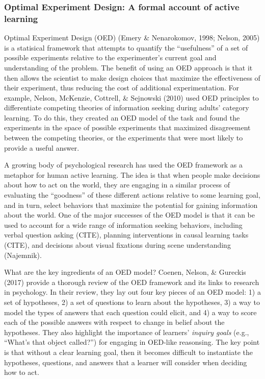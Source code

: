\documentclass[a4paper,man,apacite,floatsintext]{apa6}
\begin{document}
\subsubsection{Optimal Experiment Design: A formal account of active
learning}\label{optimal-experiment-design-a-formal-account-of-active-learning}

Optimal Experiment Design (OED) (Emery \& Nenarokomov, 1998; Nelson,
2005) is a statisical framework that attempts to quantify the
``usefulness'' of a set of possible experiments relative to the
experimenter's current goal and understanding of the problem. The
benefit of using an OED approach is that it then allows the scientist to
make design choices that maximize the effectiveness of their experiment,
thus reducing the cost of additional experimentation. For example,
Nelson, McKenzie, Cottrell, \& Sejnowski (2010) used OED principles to
differentiate competing theories of information seeking during adults'
category learning. To do this, they created an OED model of the task and
found the experiments in the space of possible experiments that
maximized disagreement between the competing theories, or the
experiments that were most likely to provide a useful answer.

A growing body of psychological research has used the OED framework as a
metaphor for human active learning. The idea is that when people make
decisions about how to act on the world, they are engaging in a similar
process of evaluating the ``goodness'' of these different actions
relative to some learning goal, and in turn, select behaviors that
maximize the potential for gaining information about the world. One of
the major successes of the OED model is that it can be used to account
for a wide range of information seeking behaviors, including verbal
question asking (CITE), planning interventions in causal learning tasks
(CITE), and decisions about visual fixations during scene understanding
(Najemnik).

What are the key ingredients of an OED model? Coenen, Nelson, \&
Gureckis (2017) provide a thorough review of the OED framework and its
links to research in psychology. In their review, they lay out four key
pieces of an OED model: 1) a set of hypotheses, 2) a set of questions to
learn about the hypotheses, 3) a way to model the types of answers that
each question could elicit, and 4) a way to score each of the possible
answers with respect to change in belief about the hypotheses. They also
highlight the importance of learners' \emph{inquiry goals} (e.g.,
``What's that object called?'') for engaging in OED-like reasonsing. The
key point is that without a clear learning goal, then it becomes
difficult to instantiate the hypotheses, questions, and answers that a
learner will consider when deciding how to act.
\end{document}
